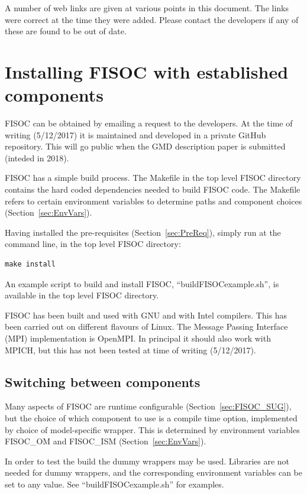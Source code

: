 \documentclass[12pt]{article}
\begin{document}
A number of web links are given at various points in this document.  
The links were correct at the time they were added. 
Please contact the developers if any of these are found to be out of date. 




\section{Installing FISOC with established components}
\label{sec:FISOC_install}

FISOC can be obtained by emailing a request to the developers.  
At the time of writing (5/12/2017) it is maintained and developed in a 
private GitHub repository.  
This will go public when the GMD description paper is 
submitted (inteded in 2018).

FISOC has a simple build process.  The Makefile in the top level FISOC directory contains the 
hard coded dependencies needed to build FISOC code.  The Makefile refers to certain 
environment variables to determine paths and component choices (Section~\ref{sec:EnvVars}). 

Having installed the pre-requisites (Section~\ref{sec:PreReq}), simply run at the command line, 
in the top level FISOC directory:
\begin{lstlisting}
make install
\end{lstlisting}

An example script to build and install FISOC, ``buildFISOCexample.sh'', is available in the top 
level FISOC directory.

FISOC has been built and used with GNU and with Intel compilers. 
This has been carried out on different flavours of Linux. 
The Message Passing Interface (MPI) implementation is OpenMPI. 
In principal it should also work with MPICH, but this has not been tested at time of writing (5/12/2017). 



\subsection{Switching between components}

Many aspects of FISOC are runtime configurable (Section~\ref{sec:FISOC_SUG}), 
but the choice of which component to use is a compile time option, implemented 
by choice of model-specific wrapper. 
This is determined by environment variables FISOC\_OM and FISOC\_ISM 
(Section~\ref{sec:EnvVars}). 

In order to test the build the dummy wrappers may be used. 
Libraries are not needed for dummy wrappers, and the corresponding 
environment variables can be set to any value.
See  ``buildFISOCexample.sh'' for examples. 
\end{document}
